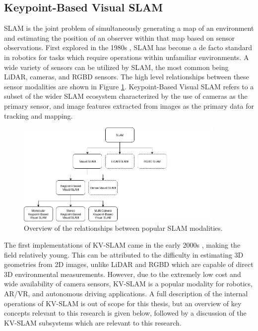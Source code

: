 \subsection{Keypoint-Based Visual SLAM}
\label{sec:kv_slam_background}

SLAM is the joint problem of simultaneously generating a map of an environment and estimating the position of an observer within that map based on sensor observations. First explored in the 1980s \cite{smithEstimatingUncertainSpatial1988}, SLAM has become a de facto standard in robotics for tasks which require operations within unfamiliar environments. A wide variety of sensors can be utilized by SLAM, the most common being LiDAR, cameras, and RGBD sensors. The high level relationships between these sensor modalities are shown in Figure \ref{fig:slam_family_tree}. Keypoint-Based Visual SLAM refers to a subset of the wider SLAM ecosystem characterized by the use of cameras as the primary sensor, and image features extracted from images as the primary data for tracking and mapping.

\begin{figure}[!ht]
    \centering
    \includegraphics[width=0.9\textwidth]{resources/slam_family_tree.png}
    \caption[SLAM Family Tree]{Overview of the relationships between popular SLAM modalities.}
    \label{fig:slam_family_tree}
\end{figure}

The first implementations of KV-SLAM came in the early 2000s \cite{seMobileRobotLocalization2002}\cite{davisonRealtimeSimultaneousLocalisation2003}, making the field relatively young. This can be attributed to the difficulty in estimating 3D geometries from 2D images, unlike LiDAR and RGBD which are capable of direct 3D environmental measurements. However, due to the extremely low cost and wide availability of camera sensors, KV-SLAM is a popular modality for robotics, AR/VR, and autonomous driving applications. A full description of the internal operations of KV-SLAM is out of scope for this thesis, but an overview of key concepts relevant to this research is given below, followed by a discussion of the KV-SLAM subsystems which are relevant to this research.

